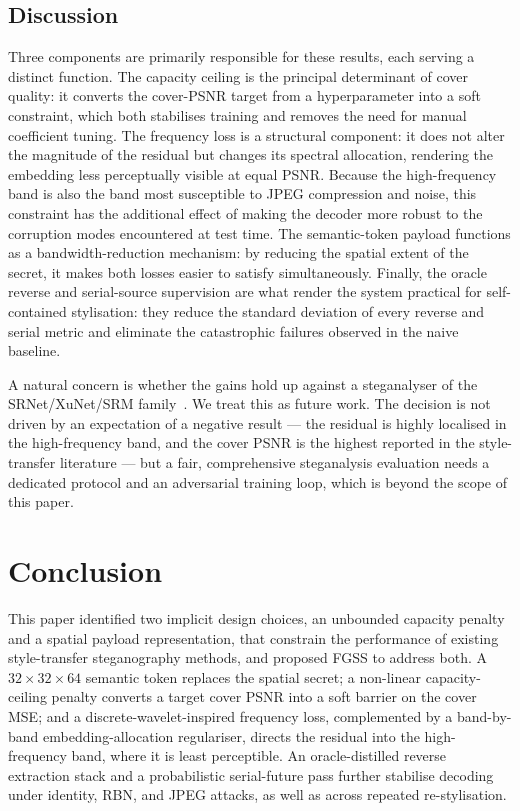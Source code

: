 \documentclass[conference]{IEEEtran}
\begin{document}
\subsection{Discussion}
Three components are primarily responsible for these results, each serving a distinct function. The capacity ceiling is the principal determinant of cover quality: it converts the cover-PSNR target from a hyperparameter into a soft constraint, which both stabilises training and removes the need for manual coefficient tuning. The frequency loss is a structural component: it does not alter the magnitude of the residual but changes its spectral allocation, rendering the embedding less perceptually visible at equal PSNR. Because the high-frequency band is also the band most susceptible to JPEG compression and noise, this constraint has the additional effect of making the decoder more robust to the corruption modes encountered at test time. The semantic-token payload functions as a bandwidth-reduction mechanism: by reducing the spatial extent of the secret, it makes both losses easier to satisfy simultaneously. Finally, the oracle reverse and serial-source supervision are what render the system practical for self-contained stylisation: they reduce the standard deviation of every reverse and serial metric and eliminate the catastrophic failures observed in the naive baseline.

A natural concern is whether the gains hold up against a steganalyser of the SRNet/XuNet/SRM family~\cite{srnet,xunet,srm}. We treat this as future work. The decision is not driven by an expectation of a negative result — the residual is highly localised in the high-frequency band, and the cover PSNR is the highest reported in the style-transfer literature — but a fair, comprehensive steganalysis evaluation needs a dedicated protocol and an adversarial training loop, which is beyond the scope of this paper.

\section{Conclusion}
This paper identified two implicit design choices, an unbounded capacity penalty and a spatial payload representation, that constrain the performance of existing style-transfer steganography methods, and proposed FGSS to address both. A $32\!\times\!32\!\times\!64$ semantic token replaces the spatial secret; a non-linear capacity-ceiling penalty converts a target cover PSNR into a soft barrier on the cover MSE; and a discrete-wavelet-inspired frequency loss, complemented by a band-by-band embedding-allocation regulariser, directs the residual into the high-frequency band, where it is least perceptible. An oracle-distilled reverse extraction stack and a probabilistic serial-future pass further stabilise decoding under identity, RBN, and JPEG attacks, as well as across repeated re-stylisation.
\end{document}
